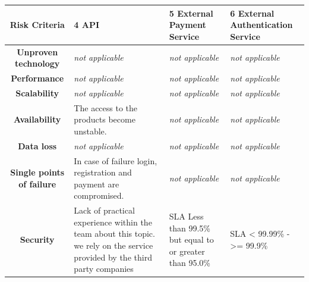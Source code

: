 \begin{table}[H]
    \begin{tabularx}{\textwidth}{|c|X|X|X|}
        \toprule
        \textbf{Risk Criteria} & \textbf{4 \gls{API}} & \textbf{5 External Payment Service} & \textbf{6 External Authentication Service} \\
        \midrule
        \textbf{Unproven technology} & \textit{not applicable} & \textit{not applicable}  & \textit{not applicable}  \\
        \hline
        \textbf{Performance} & \textit{not applicable} & \textit{not applicable}  & \textit{not applicable} \\
        \hline
        \textbf{Scalability} & \textit{not applicable} & \textit{not applicable} & \textit{not applicable} \\
        \hline
        \textbf{Availability} & The access to the products become unstable. & \textit{not applicable} & \textit{not applicable} \\
        \hline
        \textbf{Data loss} & \textit{not applicable} & \textit{not applicable} & \textit{not applicable} \\
        \hline
        \textbf{Single points of failure} & In case of failure login, registration and payment are compromised. & \textit{not applicable} & \textit{not applicable} \\
        \hline
        \textbf{Security} & Lack of practical experience within the team about this topic. we rely on the service provided by the third party companies 
        & \gls{SLA} Less than 99.5\% but equal to or greater than 95.0\% \cite{refmisc:paycSLA} & \gls{SLA} < 99.99\% - >= 99.9\% \cite{refmisc:auth0sla}	\\
        \bottomrule
    \end{tabularx}
\end{table}
%